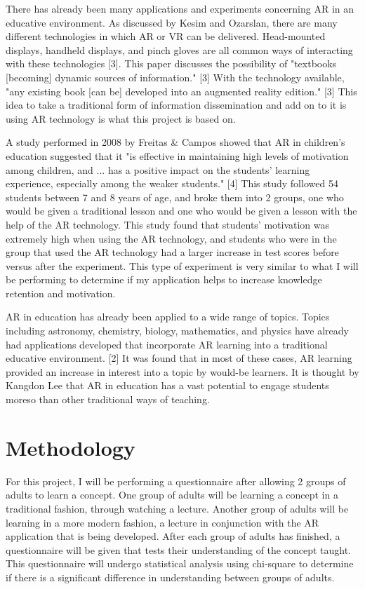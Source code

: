 \documentclass{vgtc}                          %
\begin{document}
There has already been many applications and experiments concerning AR in an educative environment.  As discussed by Kesim and Ozarslan, there are many different technologies in which AR or VR can be delivered. Head-mounted displays, handheld displays, and pinch gloves are all common ways of interacting with these technologies [3]. This paper discusses the possibility of "textbooks [becoming] dynamic sources of information." [3] With the technology available, "any existing book [can be] developed into an augmented reality edition." [3] This idea to take a traditional form of information dissemination and add on to it is using AR technology is what this project is based on. 

	A study performed in 2008 by Freitas & Campos showed that AR in children's education suggested that it "is effective in maintaining high levels of motivation among children, and ... has a positive impact on the students' learning experience, especially among the weaker students." [4] This study followed 54 students between 7 and 8 years of age, and broke them into 2 groups, one who would be given a traditional lesson and one who would be given a lesson with the help of the AR technology. This study found that students' motivation was extremely high when using the AR technology, and students who were in the group that used the AR technology had a larger increase in test scores before versus after the experiment. This type of experiment is very similar to what I will be performing to determine if my application helps to increase knowledge retention and motivation.
	
	AR in education has already been applied to a wide range of topics. Topics including astronomy, chemistry, biology, mathematics, and physics have already had applications developed that incorporate AR learning into a traditional educative environment. [2] It was found that in most of these cases, AR learning provided an increase in interest into a topic by would-be learners. It is thought by Kangdon Lee that AR in education has a vast potential to engage students moreso than other traditional ways of teaching.



\section{Methodology}

	For this project, I will be performing a questionnaire after allowing 2 groups of adults to learn a concept. One group of adults will be learning a concept in a traditional fashion, through watching a lecture. Another group of adults will be learning in a more modern fashion, a lecture in conjunction with the AR application that is being developed. After each group of adults has finished, a questionnaire will be given that tests their understanding of the concept taught. This questionnaire will undergo statistical analysis using chi-square to determine if there is a significant difference in understanding between groups of adults. 
	
\end{document}
